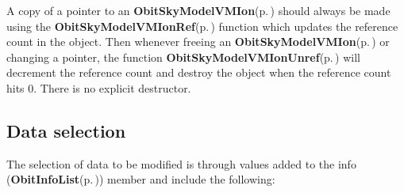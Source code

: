 A copy of a pointer to an {\bf Obit\-Sky\-Model\-VMIon}{\rm (p.\,\pageref{structObitSkyModelVMIon})} should always be made using the {\bf Obit\-Sky\-Model\-VMIon\-Ref}{\rm (p.\,\pageref{ObitSkyModelVMIon_8h_a1})} function which updates the reference count in the object. Then whenever freeing an {\bf Obit\-Sky\-Model\-VMIon}{\rm (p.\,\pageref{structObitSkyModelVMIon})} or changing a pointer, the function {\bf Obit\-Sky\-Model\-VMIon\-Unref}{\rm (p.\,\pageref{ObitSkyModelVMIon_8h_a0})} will decrement the reference count and destroy the object when the reference count hits 0. There is no explicit destructor.\subsection{Data selection}\label{ObitSkyModelVMIon_8h_ObitSkyModelVMIonselect}
The selection of data to be modified is through values added to the info ({\bf Obit\-Info\-List}{\rm (p.\,\pageref{structObitInfoList})}) member and include the following: \begin{itemize}

\end{itemize}
